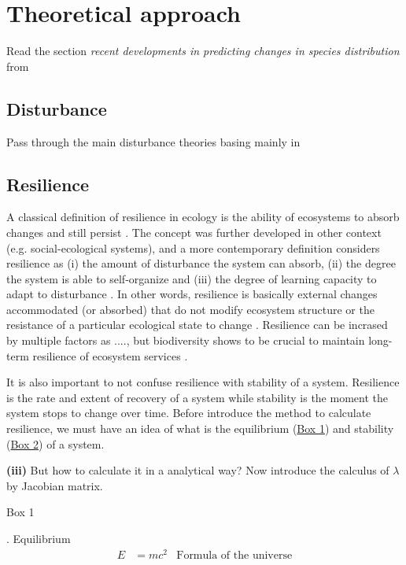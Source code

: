 \section{Theoretical approach}\label{ta}

Read the section \textit{recent developments in predicting changes in species distribution} from \citet{Ehrlen2015}

\subsection*{Disturbance}
Pass through the main disturbance theories basing mainly in \citet{Pulsford2016}

\subsection*{Resilience}

A classical definition of resilience in ecology is the ability of ecosystems to absorb changes and still persist \citep{Holling1973}.
The concept was further developed in other context (e.g. social-ecological systems), and a more contemporary definition considers resilience as (i) the amount of disturbance the system can absorb, (ii) the degree the system is able to self-organize and (iii) the degree of learning capacity to adapt to disturbance \citep{Cumming2011}.
In other words, resilience is basically external changes accommodated (or absorbed) that do not modify ecosystem structure \citep{Folke2002} or the resistance of a particular ecological state to change \citep{Peterson1998}.
Resilience can be incrased by multiple factors as ...., but biodiversity shows to be crucial to maintain long-term resilience of ecosystem services \citep{Oliver2015}.

It is also important to not confuse resilience with stability of a system. Resilience is the rate and extent of recovery of a system while stability is the moment the system stops to change over time. Before introduce the method to calculate resilience, we must have an idea of what is the equilibrium (\hyperlink{box1}{Box 1}) and stability (\hyperlink{box2}{Box 2}) of a system.

\textbf{(iii)} But how to calculate it in a analytical way?  Now introduce the calculus of $\lambda$ by Jacobian matrix.

\begin{tcolorbox}
\hypertarget{box1}{Box 1}. Equilibrium
\begin{align}
E &= mc^2 & \text{Formula of the universe}
\end{align}
\end{tcolorbox}

